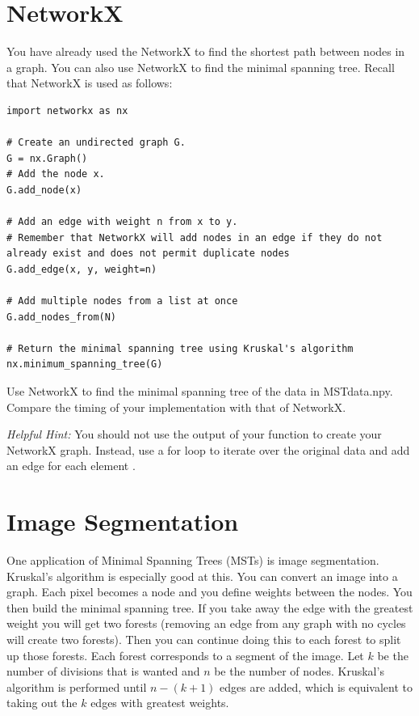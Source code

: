 \section*{NetworkX}

You have already used the NetworkX to find the shortest path between nodes in a graph. You can also use NetworkX to find the minimal spanning tree. Recall that NetworkX is used as follows:
\begin{lstlisting}
import networkx as nx

# Create an undirected graph G.
G = nx.Graph()
# Add the node x.
G.add_node(x)

# Add an edge with weight n from x to y.
# Remember that NetworkX will add nodes in an edge if they do not already exist and does not permit duplicate nodes
G.add_edge(x, y, weight=n)

# Add multiple nodes from a list at once
G.add_nodes_from(N)

# Return the minimal spanning tree using Kruskal's algorithm
nx.minimum_spanning_tree(G)
\end{lstlisting}

\begin{problem}
Use NetworkX to find the minimal spanning tree of the data in MSTdata.npy.
Compare the timing of your implementation with that of NetworkX.

\emph{Helpful Hint:} You should not use the output of your  function to create your NetworkX graph. Instead, use a for loop to iterate over the original data and add an edge  for each element  .
\end{problem}


\section*{Image Segmentation}


One application of Minimal Spanning Trees (MSTs) is image segmentation.
Kruskal's algorithm is especially good at this.
You can convert an image into a graph. Each pixel becomes a node and you define weights between the nodes. You then build the minimal spanning tree. If you take away the edge with the greatest weight you will get two forests (removing an edge from any graph with no cycles will create two forests). Then you can continue doing this to each forest to split up those forests. Each forest corresponds to a segment of the image.
Let $k$ be the number of divisions that is wanted and $n$ be the number of nodes.
Kruskal's algorithm is performed until $n-(k+1)$ edges are added, which is equivalent to taking out the $k$ edges with greatest weights.


